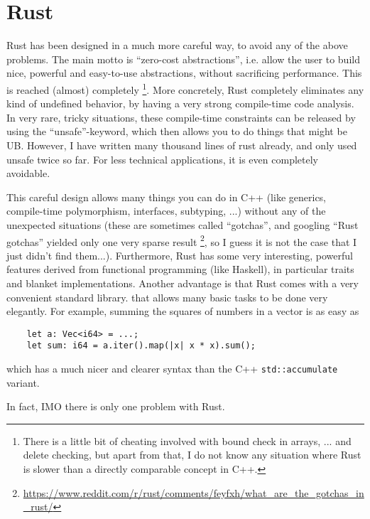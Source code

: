 \documentclass{scrartcl}
\begin{document}
\section{Rust}
Rust has been designed in a much more careful way, to avoid any of the above problems.
The main motto is ``zero-cost abstractions'', i.e. allow the user to build nice, powerful and easy-to-use abstractions, without sacrificing performance.
This is reached (almost) completely
\footnote{There is a little bit of cheating involved with bound check in arrays, ... and delete checking, but apart from that, I do not know any situation where Rust is slower than a directly comparable concept in C++.}.
More concretely, Rust completely eliminates any kind of undefined behavior, by having a very strong compile-time code analysis.
In very rare, tricky situations, these compile-time constraints can be released by using the ``unsafe''-keyword, which then allows you to do things that might be UB.
However, I have written many thousand lines of rust already, and only used unsafe twice so far.
For less technical applications, it is even completely avoidable.

This careful design allows many things you can do in C++ (like generics, compile-time polymorphism, interfaces, subtyping, ...) without any of the unexpected situations (these are sometimes called ``gotchas'', and googling ``Rust gotchas'' yielded only one very sparse result
\footnote{\href{https://www.reddit.com/r/rust/comments/feyfxh/what_are_the_gotchas_in_rust/}{https://www.reddit.com/r/rust/comments/feyfxh/what\_are\_the\_gotchas\_in\_rust/}}, so I guess it is not the case that I just didn't find them...).
Furthermore, Rust has some very interesting, powerful features derived from functional programming (like Haskell), in particular traits and blanket implementations.
Another advantage is that Rust comes with a very convenient standard library. that allows many basic tasks to be done very elegantly.
For example, summing the squares of numbers in a vector is as easy as
\begin{lstlisting}
    let a: Vec<i64> = ...;
    let sum: i64 = a.iter().map(|x| x * x).sum();
\end{lstlisting}
which has a much nicer and clearer syntax than the C++ \lstinline{std::accumulate} variant.

In fact, IMO there is only one problem with Rust.
\end{document}
